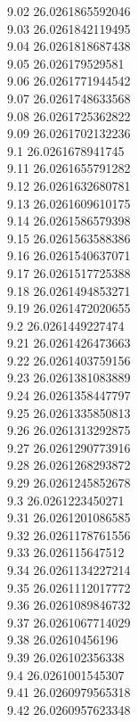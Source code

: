 {9.02	26.0261865592046\\
9.03	26.0261842119495\\
9.04	26.0261818687438\\
9.05	26.026179529581\\
9.06	26.0261771944542\\
9.07	26.0261748633568\\
9.08	26.0261725362822\\
9.09	26.0261702132236\\
9.1	26.0261678941745\\
9.11	26.0261655791282\\
9.12	26.0261632680781\\
9.13	26.0261609610175\\
9.14	26.0261586579398\\
9.15	26.0261563588386\\
9.16	26.0261540637071\\
9.17	26.0261517725388\\
9.18	26.0261494853271\\
9.19	26.0261472020655\\
9.2	26.0261449227474\\
9.21	26.0261426473663\\
9.22	26.0261403759156\\
9.23	26.0261381083889\\
9.24	26.0261358447797\\
9.25	26.0261335850813\\
9.26	26.0261313292875\\
9.27	26.0261290773916\\
9.28	26.0261268293872\\
9.29	26.0261245852678\\
9.3	26.0261223450271\\
9.31	26.0261201086585\\
9.32	26.0261178761556\\
9.33	26.026115647512\\
9.34	26.0261134227214\\
9.35	26.0261112017772\\
9.36	26.0261089846732\\
9.37	26.0261067714029\\
9.38	26.02610456196\\
9.39	26.026102356338\\
9.4	26.0261001545307\\
9.41	26.0260979565318\\
9.42	26.0260957623348\\
}
